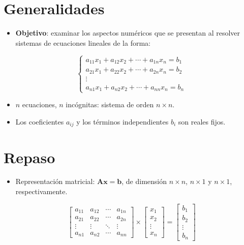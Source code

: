 \documentclass[openany]{book}
\providecommand{\tightlist}{%
  \setlength{\itemsep}{0pt}\setlength{\parskip}{0pt}}
\begin{document}
\hypertarget{generalidades-1}{%
\section{Generalidades}\label{generalidades-1}}

\begin{itemize}
\tightlist
\item
  \textbf{Objetivo}: examinar los aspectos numéricos que se presentan al resolver sistemas de ecuaciones lineales de la forma:
\end{itemize}

\[
\begin{cases} 
a_{11}x_1 + a_{12}x_2 + \cdots + a_{1n}x_n = b_1 \\
a_{21}x_1 + a_{22}x_2 + \cdots + a_{2n}x_n = b_2 \\
\vdots \\
a_{n1}x_1 + a_{n2}x_2 + \cdots + a_{nn}x_n = b_n
\end{cases}
\]

\begin{itemize}
\tightlist
\item
  \(n\) ecuaciones, \(n\) incógnitas: sistema de orden \(n \times n\).
\item
  Los coeficientes \(a_{ij}\) y los términos independientes \(b_i\) son reales fijos.
\end{itemize}

\hypertarget{repaso}{%
\section{Repaso}\label{repaso}}

\begin{itemize}
\tightlist
\item
  Representación matricial: \(\mathbf{Ax=b}\), de dimensión \(n\times n\), \(n\times 1\) y \(n\times 1\), respectivamente.
\end{itemize}

\[
\begin{bmatrix}
a_{11} & a_{12} & \cdots & a_{1n} \\
a_{21} & a_{22} & \cdots & a_{2n} \\
\vdots & \vdots & \ddots & \vdots \\
a_{n1} & a_{n2} & \cdots & a_{nn} 
\end{bmatrix}
\times 
\begin{bmatrix}
x_1 \\ x_2 \\ \vdots \\ x_n
\end{bmatrix}
=
\begin{bmatrix}
b_1 \\ b_2 \\ \vdots \\ b_n
\end{bmatrix}
\]
\end{document}

